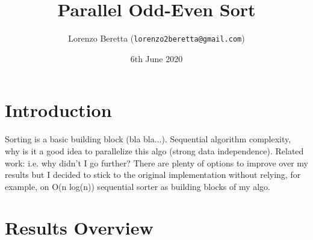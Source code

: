 \documentclass[12pt]{article}
\title{Parallel Odd-Even Sort}
\author{Lorenzo Beretta (\texttt{lorenzo2beretta@gmail.com})}
\date{6th June 2020}
\begin{document}
\maketitle

\section{Introduction}
Sorting is a basic building block (bla bla...). Sequential algorithm
complexity, why is it a good idea to parallelize this algo (strong
data independence).
Related work: i.e. why didn't I go further? There are plenty of
options to improve over my results but I decided to stick to the
original implementation without relying, for example, on O(n log(n))
sequential sorter as building blocks of my algo.

\section{Results Overview}


  

\end{document}
